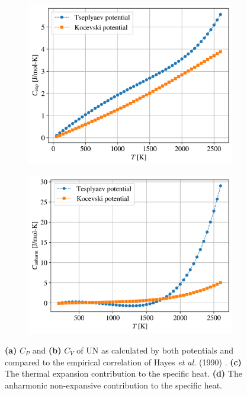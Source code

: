 \documentclass[preprint, 12pt]{elsarticle}
\begin{document}
\begin{figure}[h!]
\begin{subfigure}{0.45\textwidth}
    \includegraphics[width=\textwidth]{CD.png}
    \caption{}
    \label{Fig:CD}
\end{subfigure}
\hfill
\begin{subfigure}{0.45\textwidth}
    \includegraphics[width=\textwidth]{Canharm.png}
    \caption{}
    \label{Fig:Canharm}
\end{subfigure}
\caption{\textbf{(a)} $C_P$ and \textbf{(b)} $C_V$ of UN as calculated by both potentials and compared to the empirical correlation of Hayes \textit{et al.} (1990) \cite{Hayes1990IV}. \textbf{(c)} The thermal expansion contribution to the specific heat. \textbf{(d)} The anharmonic non-expansive contribution to the specific heat.}
\label{Fig:CVCP}
\end{figure}
\end{document}
